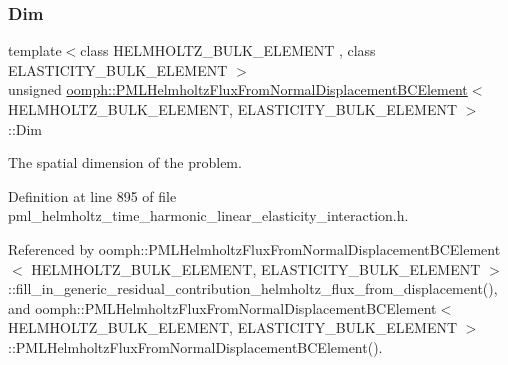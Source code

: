 \subsubsection{\texorpdfstring{Dim}{Dim}}
{\footnotesize\ttfamily template$<$class H\+E\+L\+M\+H\+O\+L\+T\+Z\+\_\+\+B\+U\+L\+K\+\_\+\+E\+L\+E\+M\+E\+NT , class E\+L\+A\+S\+T\+I\+C\+I\+T\+Y\+\_\+\+B\+U\+L\+K\+\_\+\+E\+L\+E\+M\+E\+NT $>$ \\
unsigned \hyperlink{classoomph_1_1PMLHelmholtzFluxFromNormalDisplacementBCElement}{oomph\+::\+P\+M\+L\+Helmholtz\+Flux\+From\+Normal\+Displacement\+B\+C\+Element}$<$ H\+E\+L\+M\+H\+O\+L\+T\+Z\+\_\+\+B\+U\+L\+K\+\_\+\+E\+L\+E\+M\+E\+NT, E\+L\+A\+S\+T\+I\+C\+I\+T\+Y\+\_\+\+B\+U\+L\+K\+\_\+\+E\+L\+E\+M\+E\+NT $>$\+::Dim\hspace{0.3cm}{\ttfamily [private]}}



The spatial dimension of the problem. 



Definition at line 895 of file pml\+\_\+helmholtz\+\_\+time\+\_\+harmonic\+\_\+linear\+\_\+elasticity\+\_\+interaction.\+h.



Referenced by oomph\+::\+P\+M\+L\+Helmholtz\+Flux\+From\+Normal\+Displacement\+B\+C\+Element$<$ H\+E\+L\+M\+H\+O\+L\+T\+Z\+\_\+\+B\+U\+L\+K\+\_\+\+E\+L\+E\+M\+E\+N\+T, E\+L\+A\+S\+T\+I\+C\+I\+T\+Y\+\_\+\+B\+U\+L\+K\+\_\+\+E\+L\+E\+M\+E\+N\+T $>$\+::fill\+\_\+in\+\_\+generic\+\_\+residual\+\_\+contribution\+\_\+helmholtz\+\_\+flux\+\_\+from\+\_\+displacement(), and oomph\+::\+P\+M\+L\+Helmholtz\+Flux\+From\+Normal\+Displacement\+B\+C\+Element$<$ H\+E\+L\+M\+H\+O\+L\+T\+Z\+\_\+\+B\+U\+L\+K\+\_\+\+E\+L\+E\+M\+E\+N\+T, E\+L\+A\+S\+T\+I\+C\+I\+T\+Y\+\_\+\+B\+U\+L\+K\+\_\+\+E\+L\+E\+M\+E\+N\+T $>$\+::\+P\+M\+L\+Helmholtz\+Flux\+From\+Normal\+Displacement\+B\+C\+Element().

\mbox{\label{classoomph_1_1PMLHelmholtzFluxFromNormalDisplacementBCElement_aa80b2b79bd3c63f8d7c7f91d97fd22fc}} 
